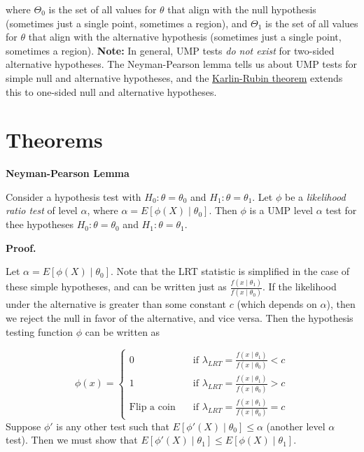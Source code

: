 \documentclass[
  letterpaper,
  DIV=11,
  numbers=noendperiod]{scrreprt}
\begin{document}
where \(\Theta_0\) is the set of all values for \(\theta\) that align
with the null hypothesis (sometimes just a single point, sometimes a
region), and \(\Theta_1\) is the set of all values for \(\theta\) that
align with the alternative hypothesis (sometimes just a single point,
sometimes a region). \textbf{Note:} In general, UMP tests \emph{do not
exist} for two-sided alternative hypotheses. The Neyman-Pearson lemma
tells us about UMP tests for simple null and alternative hypotheses, and
the
\href{https://en.wikipedia.org/wiki/Uniformly_most_powerful_test}{Karlin-Rubin
theorem} extends this to one-sided null and alternative hypotheses.

\hypertarget{theorems-6}{%
\section{Theorems}\label{theorems-6}}

\textbf{Neyman-Pearson Lemma}

Consider a hypothesis test with \(H_0: \theta = \theta_0\) and
\(H_1: \theta = \theta_1\). Let \(\phi\) be a \emph{likelihood ratio
test} of level \(\alpha\), where \(\alpha = E[\phi(X) \mid \theta_0]\).
Then \(\phi\) is a UMP level \(\alpha\) test for thee hypotheses
\(H_0: \theta = \theta_0\) and \(H_1: \theta = \theta_1\).

\textbf{Proof.}

Let \(\alpha = E[\phi(X) \mid \theta_0]\). Note that the LRT statistic
is simplified in the case of these simple hypotheses, and can be written
just as \(\frac{f(x \mid \theta_1)}{f(x \mid \theta_0)}\). If the
likelihood under the alternative is greater than some constant \(c\)
(which depends on \(\alpha\)), then we reject the null in favor of the
alternative, and vice versa. Then the hypothesis testing function
\(\phi\) can be written as

\[
\phi(x) = \begin{cases} 0 & \quad \text{if } \lambda_{LRT} = \frac{f(x \mid \theta_1)}{f(x \mid \theta_0)} < c\\
1 & \quad \text{if } \lambda_{LRT} = \frac{f(x \mid \theta_1)}{f(x \mid \theta_0)} > c\\
\text{Flip a coin} & \quad \text{if } \lambda_{LRT} = \frac{f(x \mid \theta_1)}{f(x \mid \theta_0)} = c
\end{cases}
\]Suppose \(\phi'\) is any other test such that
\(E[\phi'(X) \mid \theta_0] \leq \alpha\) (another level \(\alpha\)
test). Then we must show that
\(E[\phi'(X) \mid \theta_1] \leq E[\phi(X) \mid \theta_1]\).
\end{document}
